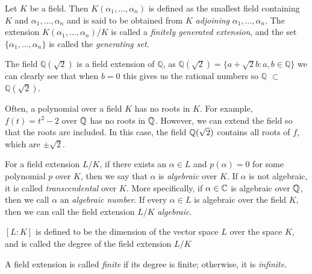 \begin{definition}
    Let $K$ be a field. Then $K(\alpha_1, \dots, \alpha_n)$ is defined as the smallest field containing $K$ and $\alpha_1, \dots, \alpha_n$ and is said to be obtained from $K$ \textit{adjoining} $\alpha_1, \dots, \alpha_n$. The extension $K(\alpha_1, \dots, \alpha_n) / K$ is called a \textit{finitely generated extension}, and the set $\{\alpha_1, \dots, \alpha_n\}$ is called the \textit{generating set}. 
\end{definition}

\begin{example}
The field \(\mathbb{Q}(\sqrt{2})\) is a field extension of \(\mathbb{Q}\), as \(\mathbb{Q}(\sqrt{2}) = \{a + \sqrt{2}b : a,b \in \mathbb{Q}\}\) we can clearly see that when \(b = 0\) this gives us the rational numbers so \(\mathbb{Q}\) $\subset$ \(\mathbb{Q}(\sqrt{2})\).
\end{example}

Often, a polynomial over a field $K$ has no roots in $K$. For example, $f(t) = t^2 - 2$ over $\mathbb Q$ has no roots in $\mathbb Q$. However, we can extend the field so that the roots are included. In this case, the field $\mathbb Q(\sqrt 2)$ contains all roots of $f$, which are $\pm \sqrt 2$.

\begin{definition}
For a field extension $L/K$, if there exists an \(\alpha \in L\) and \(p(\alpha)=0\) for some polynomial \(p\) over \(K\), then we say that \(\alpha\) is \textit{algebraic} over $K$. If \(\alpha\) is not algebraic, it is called \textit{transcendental} over \(K\). More specifically, if $\alpha \in \mathbb C$ is algebraic over $\mathbb Q$, then we call $\alpha$ an \textit{algebraic number}. If every $\alpha \in L$ is algebraic over the field $K$, then we can call the field extension $L/K$ \textit{algebraic}.

\end{definition}


\begin{definition}
    $[L:K]$ is defined to be the dimension of the vector space $L$ over the space $K$, and is called the degree of the field extension $L/K$

    A field extension is called \textit{finite} if its degree is finite; otherwise, it is \textit{infinite}. 
\end{definition}

